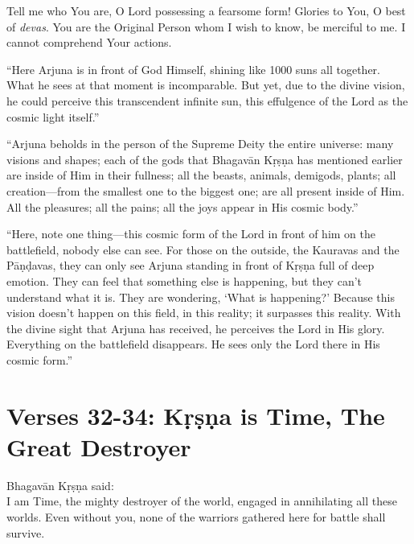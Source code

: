 {Tell me who You are, O Lord possessing a fearsome form! Glories to You, O best of \textit{devas}. You are the Original Person whom I wish to know, be merciful to me. I cannot comprehend Your actions.}

\enquote{Here Arjuna is in front of God Himself, shining like 1000 suns all together. What he sees at that moment is incomparable. But yet, due to the divine vision, he could perceive this transcendent infinite sun, this effulgence of the Lord as the cosmic light itself.}

\enquote{Arjuna beholds in the person of the Supreme Deity the entire universe: many visions and shapes; each of the gods that Bhagavān Kṛṣṇa has mentioned earlier are inside of Him in their fullness; all the beasts, animals, demigods, plants; all creation---from the smallest one to the biggest one; are all present inside of Him. All the pleasures; all the pains; all the joys appear in His cosmic body.}

\enquote{Here, note one thing---this cosmic form of the Lord in front of him on the battlefield, nobody else can see. For those on the outside, the Kauravas and the Pāṇḍavas, they can only see Arjuna standing in front of Kṛṣṇa full of deep emotion. They can feel that something else is happening, but they can’t understand what it is. They are wondering, \enquote{What is happening?} Because this vision doesn’t happen on this field, in this reality; it surpasses this reality. With the divine sight that Arjuna has received, he perceives the Lord in His glory. Everything on the battlefield disappears. He sees only the Lord there in His cosmic form.}

\section{Verses 32-34: Kṛṣṇa is Time, The Great Destroyer}\label{sec-verses-32-34-krsna-is-time-the-great-destroyer}

{\hspace*{1em}Bhagavān Kṛṣṇa said: \\
I am Time, the mighty destroyer of the world, engaged in annihilating all these worlds. Even without you, none of the warriors gathered here for battle shall survive.}

